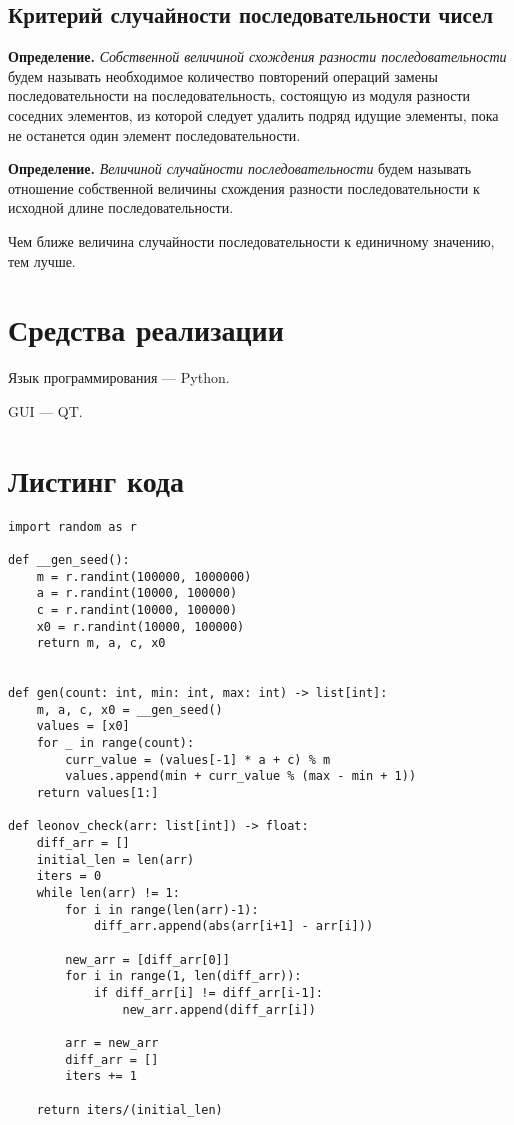 \subsection*{Критерий случайности последовательности чисел}

\textbf{Определение.} \textit{Собственной величиной схождения разности последовательности} будем называть необходимое количество повторений операций замены последовательности на последовательность, состоящую из модуля разности соседних элементов, из которой следует удалить подряд идущие элементы, пока не останется один элемент последовательности.

\textbf{Определение.} \textit{Величиной случайности последовательности} будем называть отношение собственной величины схождения разности последовательности к исходной длине последовательности.

Чем ближе величина случайности последовательности к единичному значению, тем лучше.


\section*{Средства реализации}

Язык программирования --- Python.

GUI --- QT.

\clearpage

\section*{Листинг кода}

\begin{lstlisting}
import random as r

def __gen_seed():
	m = r.randint(100000, 1000000)
	a = r.randint(10000, 100000)
	c = r.randint(10000, 100000)
	x0 = r.randint(10000, 100000)
	return m, a, c, x0


def gen(count: int, min: int, max: int) -> list[int]:
	m, a, c, x0 = __gen_seed()
	values = [x0]
	for _ in range(count):
		curr_value = (values[-1] * a + c) % m
		values.append(min + curr_value % (max - min + 1))
	return values[1:]

def leonov_check(arr: list[int]) -> float:
	diff_arr = []
	initial_len = len(arr)
	iters = 0
	while len(arr) != 1:
		for i in range(len(arr)-1):
			diff_arr.append(abs(arr[i+1] - arr[i]))
		
		new_arr = [diff_arr[0]]
		for i in range(1, len(diff_arr)):
			if diff_arr[i] != diff_arr[i-1]:
				new_arr.append(diff_arr[i])
		
		arr = new_arr
		diff_arr = []
		iters += 1
	
	return iters/(initial_len)
	

\end{lstlisting}




